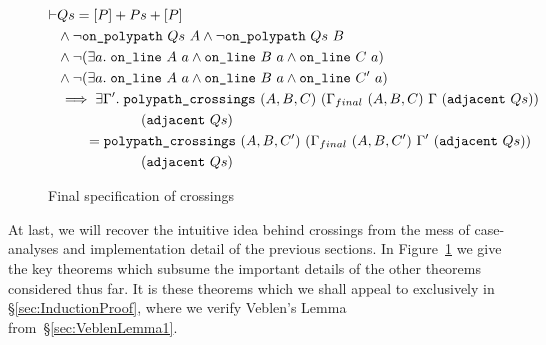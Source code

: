 \begin{figure}
\begin{multline}\label{eq:changeTriangle}
  \begin{aligned}
    \vdash&Qs = [P] + Ps + [P]\\
    &\wedge \neg\texttt{on\_polypath}\ Qs\ A \wedge \neg\texttt{on\_polypath}\ Qs\ B\\
    &\wedge \neg(\exists a.\; \texttt{on\_line}\ A\ a\wedge \texttt{on\_line}\ B\ a\wedge \texttt{on\_line}\ C\ a)\\
    &\wedge \neg(\exists a.\; \texttt{on\_line}\ A\ a\wedge \texttt{on\_line}\ B\ a\wedge \texttt{on\_line}\ C'\ a)\\
    &\implies \exists \Gamma'.\; \texttt{polypath\_crossings}\ (A,B,C)\ (\Gamma_{final}\ (A,B,C)\ \Gamma\ (\texttt{adjacent}\ Qs))\\
    &\qquad\qquad\qquad(\texttt{adjacent}\ Qs)\\
    &\qquad = \texttt{polypath\_crossings}\ (A,B,C')\ (\Gamma_{final}\ (A,B,C')\ \Gamma'\ (\texttt{adjacent}\ Qs))\\
    &\qquad\qquad\qquad(\texttt{adjacent}\ Qs)\\
  \end{aligned}
\end{multline}
\caption{Final specification of crossings}
\label{fig:CrossingsSpecification}
\end{figure}

At last, we will recover the intuitive idea behind crossings from the mess of case-analyses and implementation detail of the previous sections. In Figure~\ref{fig:CrossingsSpecification} we give the key theorems which subsume the important details of the other theorems considered thus far. It is these theorems which we shall appeal to exclusively in \S\ref{sec:InductionProof}, where we verify Veblen's Lemma from~\S\ref{sec:VeblenLemma1}.

